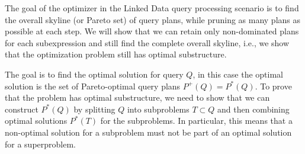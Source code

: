 The goal of the optimizer in the Linked Data query processing scenario
is to find the overall skyline (or Pareto set) of query plans, while
pruning as many plans as possible at each step. We will show that we
can retain only non-dominated plans for each subexpression and still
find the complete overall skyline, i.e., we show that the optimization
problem still has optimal substructure.

The goal is to find the optimal solution for query $Q$, in this case
the optimal solution is the set of Pareto-optimal query plans $P^+(Q)
= P^*(Q)$. To prove that the problem has optimal substructure, we need
to show that we can construct $P^*(Q)$ by splitting $Q$ into
subproblems $T \subset Q$ and then combining optimal solutions
$P^*(T)$ for the subproblems. In particular, this means that a
non-optimal solution for a subproblem must not be part of an optimal
solution for a superproblem.





